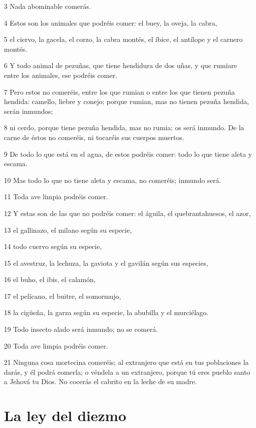 \par 3 Nada abominable comerás.
\par 4 Estos son los animales que podréis comer: el buey, la oveja, la cabra,
\par 5 el ciervo, la gacela, el corzo, la cabra montés, el íbice, el antílope y el carnero montés.
\par 6 Y todo animal de pezuñas, que tiene hendidura de dos uñas, y que rumiare entre los animales, ese podréis comer.
\par 7 Pero estos no comeréis, entre los que rumian o entre los que tienen pezuña hendida: camello, liebre y conejo; porque rumian, mas no tienen pezuña hendida, serán inmundos;
\par 8 ni cerdo, porque tiene pezuña hendida, mas no rumia; os será inmundo. De la carne de éstos no comeréis, ni tocaréis sus cuerpos muertos.
\par 9 De todo lo que está en el agua, de estos podréis comer: todo lo que tiene aleta y escama.
\par 10 Mas todo lo que no tiene aleta y escama, no comeréis; inmundo será.
\par 11 Toda ave limpia podréis comer.
\par 12 Y estas son de las que no podréis comer: el águila, el quebrantahuesos, el azor,
\par 13 el gallinazo, el milano según su especie,
\par 14 todo cuervo según su especie,
\par 15 el avestruz, la lechuza, la gaviota y el gavilán según sus especies, 
\par 16 el buho, el ibis, el calamón,
\par 17 el pelícano, el buitre, el somormujo,
\par 18 la cigüeña, la garza según su especie, la abubilla y el murciélago.
\par 19 Todo insecto alado será inmundo; no se comerá.
\par 20 Toda ave limpia podréis comer.
\par 21 Ninguna cosa mortecina comeréis; al extranjero que está en tus poblaciones la darás, y él podrá comerla; o véndela a un extranjero, porque tú eres pueblo santo a Jehová tu Dios. No cocerás el cabrito en la leche de su madre.

\section{La ley del diezmo}

